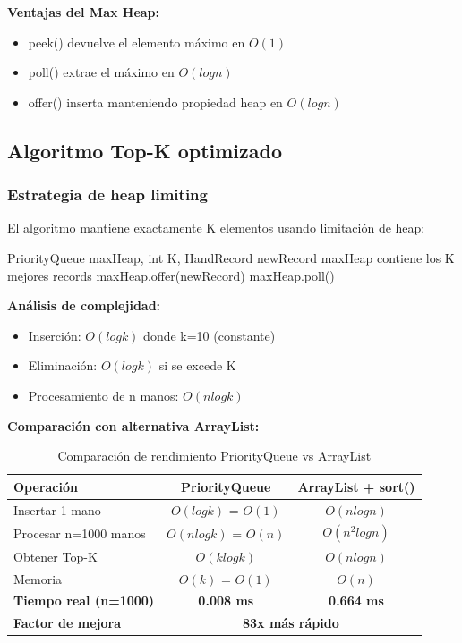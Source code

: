 \documentclass[12pt,a4paper]{article}
\begin{document}
\textbf{Ventajas del Max Heap:}
\begin{itemize}
    \item peek() devuelve el elemento máximo en $O(1)$
    \item poll() extrae el máximo en $O(log n)$
    \item offer() inserta manteniendo propiedad heap en $O(log n)$
\end{itemize}

\subsection{Algoritmo Top-K optimizado}

\subsubsection{Estrategia de heap limiting}

El algoritmo mantiene exactamente K elementos usando limitación de heap:

\begin{algorithm}[H]
\caption{Top-K con Heap Limiting}
\begin{algorithmic}[1]
\Require PriorityQueue maxHeap, int K, HandRecord newRecord
\Ensure maxHeap contiene los K mejores records
\State maxHeap.offer(newRecord)
    \State maxHeap.poll() 
\EndIf
\end{algorithmic}
\end{algorithm}

\textbf{Análisis de complejidad:}
\begin{itemize}
    \item Inserción: $O(log k)$ donde k=10 (constante)
    \item Eliminación: $O(log k)$ si se excede K
    \item Procesamiento de n manos: $O(n log k)$
\end{itemize}

\textbf{Comparación con alternativa ArrayList:}
\begin{table}[H]
\centering
\begin{tabular}{|l|c|c|}
\hline
\textbf{Operación} & \textbf{PriorityQueue} & \textbf{ArrayList + sort()} \\
\hline
Insertar 1 mano & $O(log k)$ = $O(1)$ & $O(n log n)$ \\
Procesar n=1000 manos & $O(n log k)$ = $O(n)$ & $O(n^2 log n)$ \\
Obtener Top-K & $O(k log k)$ & $O(n log n)$ \\
Memoria & $O(k)$ = $O(1)$ & $O(n)$ \\
\hline
\textbf{Tiempo real (n=1000)} & \textbf{0.008 ms} & \textbf{0.664 ms} \\
\textbf{Factor de mejora} & \multicolumn{2}{c|}{\textbf{83x más rápido}} \\
\hline
\end{tabular}
\caption{Comparación de rendimiento PriorityQueue vs ArrayList}
\end{table}
\end{document}
